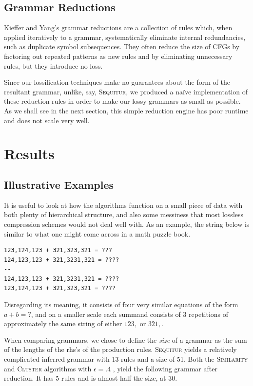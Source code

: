 \documentclass[11pt]{article}
\newcommand{\Sequitur}{\textsc{Sequitur}\xspace}
\newcommand{\Similarity}{\textsc{Similarity}\xspace}
\newcommand{\Cluster}{\textsc{Cluster}\xspace}
\begin{document}
\subsection{Grammar Reductions}

Kieffer and Yang's grammar reductions are a collection of rules which, when
applied iteratively to a grammar, systematically eliminate internal
redundancies, such as duplicate symbol subsequences.  They often reduce the
size of CFGs by factoring out repeated patterns as new rules and by eliminating
unnecessary rules, but they introduce no loss.

Since our lossification techniques make no guarantees about the form of the
resultant grammar, unlike, say, \Sequitur, we produced a na\"ive implementation
of these reduction rules in order to make our lossy grammars as small as
possible.  As we shall see in the next section, this simple reduction engine
has poor runtime and does not scale very well.

\section{Results}

\subsection{Illustrative Examples}

It is useful to look at how the algorithms function on a small piece of data
with both plenty of hierarchical structure, and also some messiness that most
lossless compression schemes would not deal well with. As an example,
the string below is
similar to what one might come across in a math puzzle book.

\begin{verbatim}
123,124,123 + 321,323,321 = ???
124,123,123 + 321,3231,321 = ????
--
124,123,123 + 321,3231,321 = ????
123,124,123 + 321,323,321 = ????
\end{verbatim}

Disregarding its meaning, it consists of four very similar equations of the
form $a + b = ?$, and on a smaller scale each summand consists of 3 repetitions
of approximately the same string of either $123,$ or $321,$.

When comparing grammars, we chose to define the \emph{size} of a grammar as the
sum of the lengths of the rhs's of the production rules.  \Sequitur yields a
relatively complicated inferred grammar with 13 rules and a size of 51. Both
the \Similarity and \Cluster algorithms with $\epsilon = .4$ , yield the
following grammar after reduction. It has 5 rules and is almost half the size,
at 30.
\end{document}
